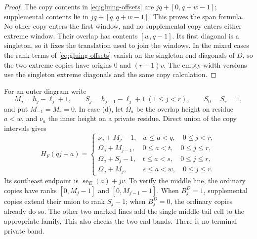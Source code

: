 \documentclass[11pt,a4paper]{amsart}
\numberwithin{equation}{section}
\theoremstyle{plain}
\theoremstyle{definition}
\begin{document}
\begin{proof}
The copy contents in \eqref{eq:gluing-offsets} are \(jq+[0,q+w-1]\); supplemental contents lie in \(jq+[q,q+w-1]\).  This proves the span formula.  No other copy enters the first window, and no supplemental copy enters either extreme window.  Their overlap has contents \([w,q-1]\).  Its first diagonal is a singleton, so it fixes the translation used to join the windows.  In the mixed cases the rank terms of \eqref{eq:gluing-offsets} vanish on the singleton end diagonals of \(D\), so the two extreme copies have origins \(0\) and \((r-1)v\).  The empty-width versions use the singleton extreme diagonals and the same copy calculation.
\end{proof}

For an outer diagram write
\begin{equation}\label{eq:gluing-profile}
 M_j=h_j-\ell_j+1,\qquad
 S_j=h_{j-1}-\ell_j+1\ (1\le j<r),\qquad S_0=S_r=1,
\end{equation}
and put \(M_{-1}=M_r=0\).  In case (d), let \(\Omega_a\) be the overlap height on residue \(a<w\), and \(\nu_a\) the inner height on a private residue.  Direct union of the copy intervals gives
\begin{equation}\label{eq:gluing-mixed-profile}
 H_F(qj+a)=
 \begin{cases}
 \nu_a+M_j-1,&w\le a<q,\quad 0\le j<r,\\
 \Omega_a+M_{j-1},&0\le a<t,\quad 0\le j\le r,\\
 \Omega_a+S_j-1,&t\le a<s,\quad 0\le j\le r,\\
 \Omega_a+M_j,&s\le a<w,\quad 0\le j\le r.
 \end{cases}
\end{equation}
Its southeast endpoint is \(\operatorname{se}_E(a)+jv\).  To verify the middle line, the ordinary copies have ranks \([0,M_j-1]\) and \([0,M_{j-1}-1]\).  When \(B^D_j=1\), supplemental copies extend their union to rank \(S_j-1\); when \(B^D_j=0\), the ordinary copies already do so.  The other two marked lines add the single middle-tail cell to the appropriate family.  This also checks the two end bands.  There is no terminal private band.
\end{document}
